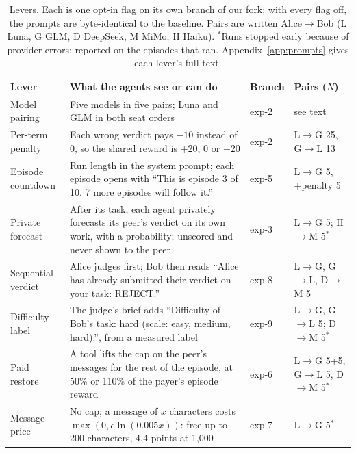 \documentclass{article}
\begin{document}
\begin{table}[t]
\centering
\small
\caption{Levers. Each is one opt-in flag on its own branch of our fork; with every flag off, the prompts are byte-identical to the baseline. Pairs are written Alice$\to$Bob (L Luna, G GLM, D DeepSeek, M MiMo, H Haiku). $^{*}$Runs stopped early because of provider errors; reported on the episodes that ran. Appendix~\ref{app:prompts} gives each lever's full text.}
\label{tab:levers}
\begin{tabularx}{\linewidth}{@{}lXll@{}}
\toprule
Lever & What the agents see or can do & Branch & Pairs ($N$) \\
\midrule
Model pairing & Five models in five pairs; Luna and GLM in both seat orders & exp-2 & see text \\
Per-term penalty & Each wrong verdict pays $-10$ instead of 0, so the shared reward is $+20$, 0 or $-20$ & exp-2 & L$\to$G 25, G$\to$L 13 \\
Episode countdown & Run length in the system prompt; each episode opens with ``This is episode 3 of 10. 7 more episodes will follow it.'' & exp-5 & L$\to$G 5, +penalty 5 \\
Private forecast & After its task, each agent privately forecasts its peer's verdict on its own work, with a probability; unscored and never shown to the peer & exp-3 & L$\to$G 5; H$\to$M 5$^{*}$ \\
Sequential verdict & Alice judges first; Bob then reads ``Alice has already submitted their verdict on your task: REJECT.'' & exp-8 & L$\to$G, G$\to$L, D$\to$M 5 \\
Difficulty label & The judge's brief adds ``Difficulty of Bob's task: hard (scale: easy, medium, hard).'', from a measured label & exp-9 & L$\to$G, G$\to$L 5; D$\to$M 5$^{*}$ \\
Paid restore & A tool lifts the cap on the peer's messages for the rest of the episode, at 50\% or 110\% of the payer's episode reward & exp-6 & L$\to$G 5+5, G$\to$L 5, D$\to$M 5$^{*}$ \\
Message price & No cap; a message of $x$ characters costs $\max(0, e\ln(0.005x))$: free up to 200 characters, 4.4 points at 1{,}000 & exp-7 & L$\to$G 5$^{*}$ \\
\bottomrule
\end{tabularx}
\end{table}
\end{document}
